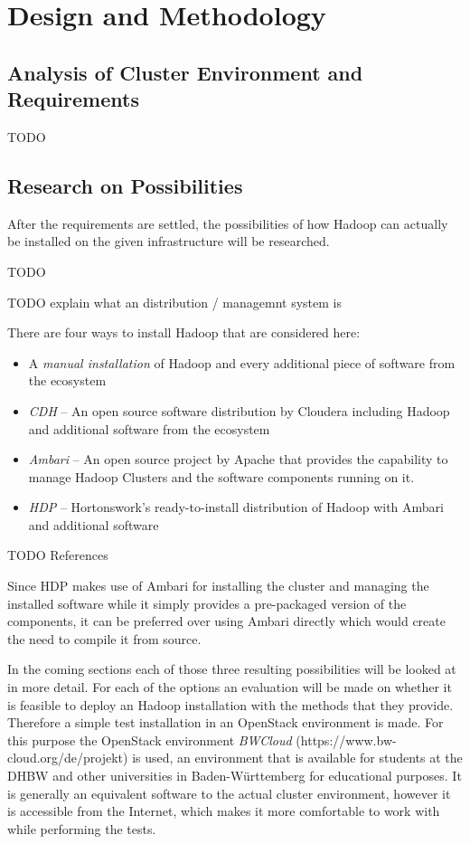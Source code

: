 \chapter{Design and Methodology}
\label{chap:design}

\section{Analysis of Cluster Environment and Requirements}

TODO

\section{Research on Possibilities}

After the requirements are settled,
the possibilities of how Hadoop can actually be installed 
on the given infrastructure will be researched.

TODO

TODO explain what an distribution / managemnt system is

There are four ways to install Hadoop that are considered here:

\begin{itemize}
    \item A \emph{manual installation} of Hadoop 
        and every additional piece of software from the ecosystem
    \item \emph{\ac{CDH}} --  An open source software distribution by Cloudera including Hadoop
        and additional software from the ecosystem
    \item \emph{Ambari} -- An open source project by Apache that provides
        the capability to manage Hadoop Clusters and the software components running on it.
    \item \emph{\ac{HDP}} -- Hortonswork's ready-to-install distribution of Hadoop 
        with Ambari and additional software
\end{itemize}

TODO References

Since \ac{HDP} makes use of Ambari for installing the cluster and managing the installed software while it simply provides a pre-packaged version of the components, 
it can be preferred over using Ambari directly which would create the need to compile it from source.

In the coming sections each of those three resulting possibilities will be looked at in more detail.
For each of the options an evaluation will be made on whether it is 
feasible to deploy an Hadoop installation with the methods that they provide.
Therefore a simple test installation in an OpenStack environment is made.
For this purpose the OpenStack environment \emph{BWCloud} (https://www.bw-cloud.org/de/projekt) 
is used, an environment that is available for students at the \ac{DHBW} 
and other universities in Baden-Württemberg for educational purposes. 
It is generally an equivalent software to the actual cluster environment, 
however it is accessible from the Internet, 
which makes it more comfortable to work with while performing the tests.

